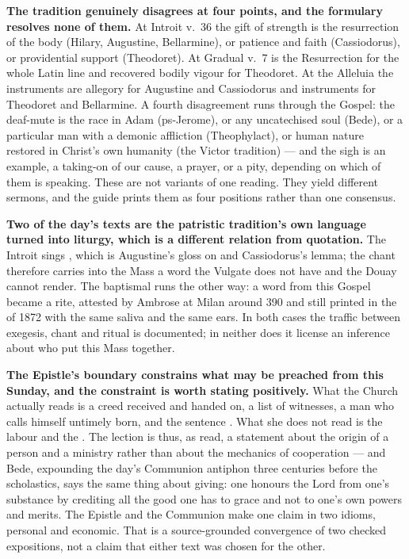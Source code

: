 \textbf{The tradition genuinely disagrees at four points, and the formulary
resolves none of them.} At Introit v.~36 the gift of strength is the
resurrection of the body (Hilary, Augustine, Bellarmine), or patience and faith
(Cassiodorus), or providential support (Theodoret). At Gradual v.~7
 is the Resurrection for the whole Latin line and recovered
bodily vigour for Theodoret. At the Alleluia the instruments are allegory for
Augustine and Cassiodorus and instruments for Theodoret and Bellarmine. A
fourth disagreement runs through the Gospel: the deaf-mute is the race in Adam
(ps-Jerome), or any uncatechised soul (Bede), or a particular man with a
demonic affliction (Theophylact), or human nature restored in Christ's own
humanity (the Victor tradition) --- and the sigh is an example, a taking-on of
our cause, a prayer, or a pity, depending on which of them is speaking. These
are not variants of one reading. They yield different sermons, and the guide
prints them as four positions rather than one consensus.

\textbf{Two of the day's texts are the patristic tradition's own language
turned into liturgy, which is a different relation from quotation.} The
Introit sings , which is Augustine's gloss on  and Cassiodorus's lemma; the chant therefore carries into the Mass a word
the Vulgate does not have and the Douay cannot render. The baptismal
 runs the other way: a word from this Gospel became a rite,
attested by Ambrose at Milan around 390 and still printed in the
 of 1872 with the same saliva and the same ears. In both
cases the traffic between exegesis, chant and ritual is documented; in neither
does it license an inference about who put this Mass together.

\textbf{The Epistle's boundary constrains what may be preached from this
Sunday, and the constraint is worth stating positively.} What the Church
actually reads is a creed received and handed on, a list of witnesses, a man
who calls himself untimely born, and the sentence . What she does not read is the labour and the . The lection
is thus, as read, a statement about the origin of a person and a ministry
rather than about the mechanics of cooperation --- and Bede, expounding the
day's Communion antiphon three centuries before the scholastics, says the same
thing about giving: one honours the Lord from one's substance by crediting all
the good one has to grace and not to one's own powers and merits. The Epistle and the
Communion make one claim in two idioms, personal and economic. That is a
source-grounded convergence of two checked expositions, not a claim that either
text was chosen for the other.

